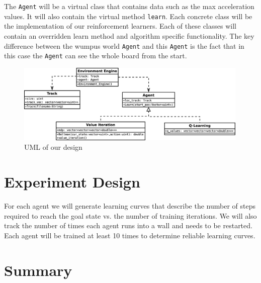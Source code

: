 \documentclass{article}
\begin{document}
	The \texttt{Agent} will be a virtual class that contains data such as the max acceleration values. It will also contain the virtual method \texttt{learn}. Each concrete class will be the implementation of our reinforcement learners. Each of these classes will contain an overridden learn method and algorithm specific functionality. The key difference between the wumpus world \texttt{Agent} and this \texttt{Agent} is the fact that in this case the \texttt{Agent} can see the whole board from the start.
	\begin{figure}[h!]
		\centering
		\includegraphics[width=0.99\textwidth]{Diagrams/uml}
		\caption{UML of our design}
	\end{figure}
	\section{Experiment Design}
		 For each agent we will generate learning curves that describe the number of steps required to reach the goal state vs. the number of training iterations. We will also track the number of times each agent runs into a wall and needs to be restarted. Each agent will be trained at least 10 times to determine reliable learning curves.
	\section{Summary}

		
	
\end{document}
